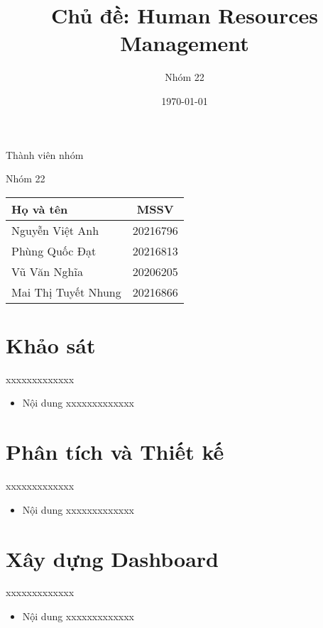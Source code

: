 \documentclass{beamer}
\title[{\makebox[.15\paperwidth]{Human Resources Management}}]{Chủ đề: Human Resources Management}
\author[Nhóm 22]{Nhóm 22}
\date[Data Warehouse \& BI]{\today}
\begin{document}
\begin{frame}
\titlepage
\end{frame}
\begin{frame}{Thành viên nhóm}
\begin{block}{Nhóm 22}
\centering
\begin{tabular} {|l|c|}
\hline
Họ và tên & MSSV \\
\hline
Nguyễn Việt Anh & 20216796 \\
Phùng Quốc Đạt & 20216813 \\
Vũ Văn Nghĩa & 20206205 \\
Mai Thị Tuyết Nhung & 20216866 \\
\hline
\end{tabular}
\end{block}
\end{frame}
\section{Khảo sát}
\begin{frame}{xxxxxxxxxxxxx}
\begin{itemize}
\item Nội dung xxxxxxxxxxxxx
\end{itemize}
\end{frame}
\section{Phân tích và Thiết kế}
\begin{frame}{xxxxxxxxxxxxx}
\begin{itemize}
\item Nội dung xxxxxxxxxxxxx
\end{itemize}
\end{frame}
\section{Xây dựng Dashboard}
\begin{frame}{xxxxxxxxxxxxx}
\begin{itemize}
\item Nội dung xxxxxxxxxxxxx
\end{itemize}
\end{frame}
\end{document}
